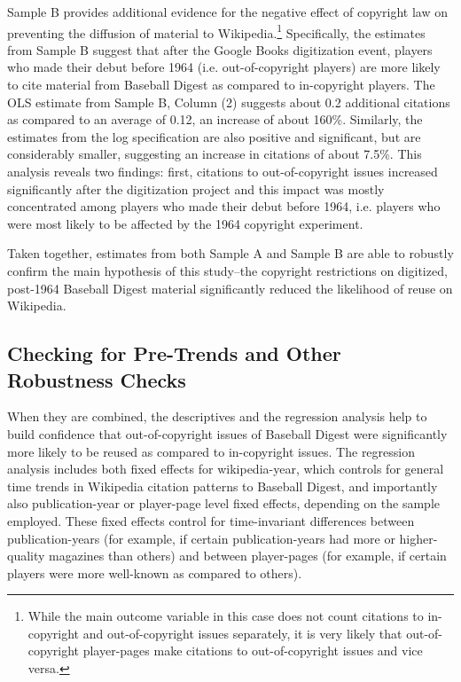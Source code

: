 \documentclass[11pt]{article}
\begin{document}
Sample B provides additional evidence for the negative effect of copyright law on preventing the diffusion of material to Wikipedia.\footnote{While the main outcome variable in this case does not count citations to in-copyright and out-of-copyright issues separately, it is very likely that out-of-copyright player-pages make citations to out-of-copyright issues and vice versa.} Specifically, the estimates from Sample B suggest that after the Google Books digitization event, players who made their debut before 1964 (i.e. out-of-copyright players) are more likely to cite material from Baseball Digest as compared to in-copyright players. The OLS estimate from Sample B, Column (2) suggests about 0.2 additional citations as compared to an average of 0.12, an increase of about 160\%. Similarly, the estimates from the log specification are also positive and significant, but are considerably smaller, suggesting an increase in citations of about 7.5\%. This analysis reveals two findings: first, citations to out-of-copyright issues increased significantly after the digitization project and this impact was mostly concentrated among players who made their debut before 1964, i.e. players who were most likely to be affected by the 1964 copyright experiment.

Taken together, estimates from both Sample A and Sample B are able to robustly confirm the main hypothesis of this study--the copyright restrictions on digitized, post-1964 Baseball Digest material significantly reduced the likelihood of reuse on Wikipedia.

\subsection{Checking for Pre-Trends and Other Robustness Checks}

When they are combined, the descriptives and the regression analysis help to build confidence that out-of-copyright issues of Baseball Digest were significantly more likely to be reused as compared to in-copyright issues. The regression analysis includes both fixed effects for wikipedia-year, which controls for general time trends in Wikipedia citation patterns to Baseball Digest, and importantly also publication-year or player-page level fixed effects, depending on the sample employed. These fixed effects control for time-invariant differences between publication-years (for example, if certain publication-years had more or higher-quality magazines than others) and between player-pages (for example, if certain players were more well-known as compared to others). 
\end{document}
